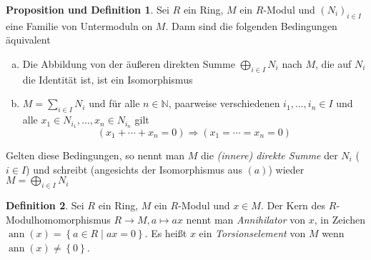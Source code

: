 \documentclass[
twoside=semi,
fontsize=12,
DIV=12, 
cleardoublepage=current,
leqno,
headings=optiontoheadandtoc, 
toc=idx
]{scrbook}
\newcommand{\N}{\mathbb{N}}
\newcommand{\set}[1]{\left\{ #1 \right\}}
\DeclareMathOperator{\ann}{ann}
\theoremstyle{definition}
\newtheorem{definition}{Definition}[section]
\newtheorem{prop-def}[definition]{Proposition und Definition}
\begin{document}
	\begin{prop-def}\label{1.2.3}\hfill\newline
		Sei $R$ ein Ring, $M$ ein $R$-Modul und $(N_i)_{i \in I}$ eine Familie von Untermoduln on $M$. Dann sind die folgenden Bedingungen \"aquivalent
		\begin{enumerate}[(a)]
			\item Die Abbildung von der \"au\ss eren direkten Summe $\bigoplus_{i \in I} N_i$ nach $M$, die auf $N_i$ die Identit\"at ist, ist ein Isomorphismus
			\item $\displaystyle M = \sum_{i \in I} N_i$ und f\"ur alle $n \in \N$, paarweise verschiedenen $i_1, \dots, i_n \in I$ und alle $x_1 \in N_{i_1}, \dots, x_n \in N_{i_n}$ gilt 
				\[(x_1 + \cdots + x_n = 0) \Rightarrow (x_1 = \cdots = x_n = 0)\]  
		\end{enumerate}
	Gelten diese Bedingungen, so nennt man $M$ die \emph{(innere) direkte Summe} der $N_i$ ($i \in I$) und schreibt (angesichts der Isomorphismus aus $(a)$) wieder $\displaystyle M = \bigoplus_{i \in I} N_i$
	\end{prop-def}

	\begin{definition}\label{1.2.4}\hfill\newline
		Sei $R$ ein Ring, $M$ ein $R$-Modul und $x \in M$. Der Kern des $R$-Modulhomomorphismus $R \to M, a \mapsto ax$ nennt man \emph{Annihilator} von $x$, in Zeichen $\ann(x) = \set{a \in R \mid ax = 0}$.\newline
		Es hei\ss t $x$ ein \emph{Torsionselement} von $M$ wenn $\ann(x) \neq \set{0}$.
	\end{definition}
\end{document}
